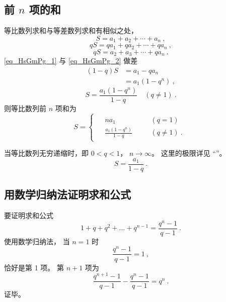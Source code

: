 \subsection{前 $n$ 项的和}
等比数列求和与等差数列求和有相似之处，
\begin{equation}\label{eq_HsGmPg_1}
S = a_1 + a_2 + \cdots + a_n~,
\end{equation}
\begin{equation}
qS = qa_1 + qa_2 + \cdots + qa_n~,
\end{equation}
\begin{equation}\label{eq_HsGmPg_2}
qS= a_2 + a_3 + \cdots + qa_n~.
\end{equation}
\autoref{eq_HsGmPg_1} 与 \autoref{eq_HsGmPg_2} 做差
\begin{equation}
\begin{aligned}
(1 - q)S &= a_1 - qa_n\\
&= a_1(1 - q^n)~,
\end{aligned}
\end{equation}
\begin{equation}
S = \frac{a_1(1-q^n)}{1-q} \quad (q\neq 1)~.
\end{equation}
则等比数列前 $n$ 项和为
\begin{equation}
S = 
\begin{cases}
\begin{aligned}
&na_1 &\quad &(q = 1) \\
&\frac{a_1(1-q^n)}{1-q} &\quad &(q \neq 1)~.
\end{aligned}
\end{cases}
\end{equation}

当等比数列无穷递缩时，即 $0<q<1$， $n\rightarrow \infty$。 这里的极限详见 “”。
\begin{equation}
S = \frac{a_1}{1 - q}~.
\end{equation}

\subsection{用数学归纳法证明求和公式}
要证明求和公式
\begin{equation}
1 + q + q^2 + \dots + q^{n-1} = \frac{q^n - 1}{q - 1}~.
\end{equation}
使用数学归纳法， 当 $n = 1$ 时
\begin{equation}
\frac{q^n - 1}{q - 1} = 1~,
\end{equation}
恰好是第 1 项。 第 $n + 1$ 项为
\begin{equation}
\frac{q^{n+1} - 1}{q - 1} - \frac{q^n - 1}{q - 1} = q^n~.
\end{equation}
证毕。
